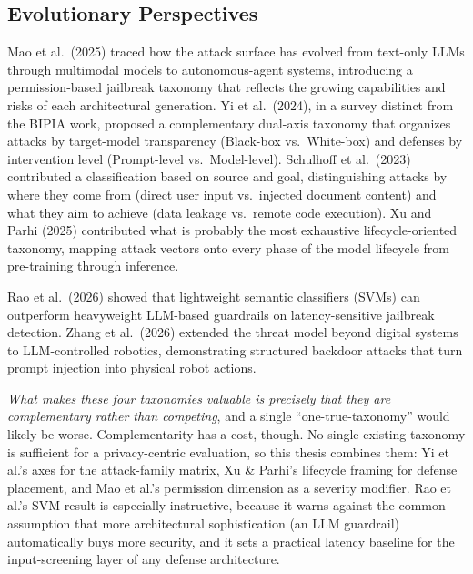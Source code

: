 \documentclass[12pt,a4paper]{report}
\begin{document}
\subsection{Evolutionary Perspectives}

Mao et al.\ (2025) traced how the attack surface has evolved from text-only LLMs through multimodal models to autonomous-agent systems, introducing a permission-based jailbreak taxonomy that reflects the growing capabilities and risks of each architectural generation. Yi et al.\ (2024), in a survey distinct from the BIPIA work, proposed a complementary dual-axis taxonomy that organizes attacks by target-model transparency (Black-box vs.\ White-box) and defenses by intervention level (Prompt-level vs.\ Model-level). Schulhoff et al.\ (2023) contributed a classification based on source and goal, distinguishing attacks by where they come from (direct user input vs.\ injected document content) and what they aim to achieve (data leakage vs.\ remote code execution). Xu and Parhi (2025) contributed what is probably the most exhaustive lifecycle-oriented taxonomy, mapping attack vectors onto every phase of the model lifecycle from pre-training through inference.

Rao et al.\ (2026) showed that lightweight semantic classifiers (SVMs) can outperform heavyweight LLM-based guardrails on latency-sensitive jailbreak detection. Zhang et al.\ (2026) extended the threat model beyond digital systems to LLM-controlled robotics, demonstrating structured backdoor attacks that turn prompt injection into physical robot actions.

\begin{critbox}
\textit{What makes these four taxonomies valuable is precisely that they are complementary rather than competing}, and a single ``one-true-taxonomy'' would likely be worse. Complementarity has a cost, though. No single existing taxonomy is sufficient for a privacy-centric evaluation, so this thesis combines them: Yi et al.'s axes for the attack-family matrix, Xu \& Parhi's lifecycle framing for defense placement, and Mao et al.'s permission dimension as a severity modifier. Rao et al.'s SVM result is especially instructive, because it warns against the common assumption that more architectural sophistication (an LLM guardrail) automatically buys more security, and it sets a practical latency baseline for the input-screening layer of any defense architecture.
\end{critbox}
\end{document}
